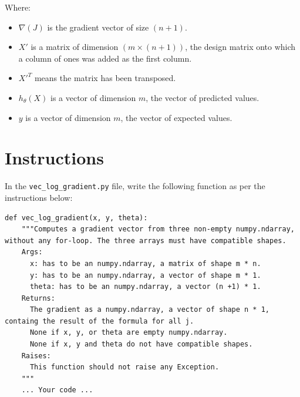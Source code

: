 \documentclass{42-en}
\begin{document}
Where:  
\begin{itemize}
  \item $\nabla(J)$ is the gradient vector of size $(n + 1)$.
  \item $X'$ is a matrix of dimension $(m \times (n + 1))$, the design matrix onto which a column of ones was added as the first column.
  \item $X'^T$ means the matrix has been transposed.
  \item $h_\theta(X)$ is a vector of dimension $m$, the vector of predicted values.
  \item $y$ is a vector of dimension $m$, the vector of expected values.
\end{itemize}


\section*{Instructions}
In the \texttt{vec\_log\_gradient.py} file, write the following function as per the instructions below:

\par

\begin{verbatim}
def vec_log_gradient(x, y, theta):
    """Computes a gradient vector from three non-empty numpy.ndarray, without any for-loop. The three arrays must have compatible shapes.
    Args:
      x: has to be an numpy.ndarray, a matrix of shape m * n.
      y: has to be an numpy.ndarray, a vector of shape m * 1.
      theta: has to be an numpy.ndarray, a vector (n +1) * 1.
    Returns:
      The gradient as a numpy.ndarray, a vector of shape n * 1, containg the result of the formula for all j.
      None if x, y, or theta are empty numpy.ndarray.
      None if x, y and theta do not have compatible shapes.
    Raises:
      This function should not raise any Exception.
    """
    ... Your code ...
\end{verbatim}


\end{document}

